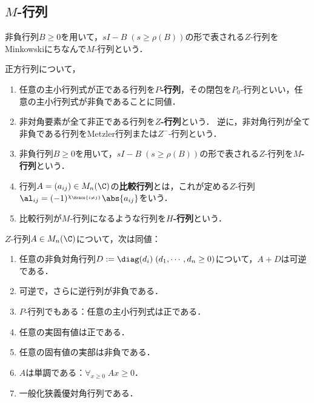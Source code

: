 \documentclass[uplatex, dvipdfmx]{jsreport}
\begin{document}
\subsection{$M$-行列}

\begin{tcolorbox}[colframe=ForestGreen, colback=ForestGreen!10!white,breakable,colbacktitle=ForestGreen!40!white,coltitle=black,fonttitle=\bfseries\sffamily,
title=]
    非負行列$B\ge0$を用いて，$sI-B\;(s\ge\rho(B))$の形で表される$Z$-行列をMinkowskiにちなんで$M$-行列という． 
\end{tcolorbox}

\begin{definition}
    正方行列について，
    \begin{enumerate}
        \item 任意の主小行列式が正である行列を\textbf{$P$-行列}，その閉包を$P_0$-行列といい，任意の主小行列式が非負であることに同値．
        \item 非対角要素が全て非正である行列を\textbf{$Z$-行列}という．
        逆に，非対角行列が全て非負である行列をMetzler行列または$Z^-$-行列という．
        \item 非負行列$B\ge0$を用いて，$sI-B\;(s\ge\rho(B))$の形で表される$Z$-行列を\textbf{$M$-行列}という．
        \item 行列$A=(a_{ij})\in M_n(\C)$の\textbf{比較行列}とは，これが定める$Z$-行列$\al_{ij}=(-1)^{\chi_{\Brace{i\ne j}}}\abs{a_{ij}}$をいう．
        \item 比較行列が$M$-行列になるような行列を\textbf{$H$-行列}という．
    \end{enumerate}
\end{definition}

\begin{theorem}
    $Z$-行列$A\in M_n(\C)$について，次は同値：
    \begin{enumerate}
        \item 任意の非負対角行列$D:=\diag(d_i)\;(d_1,\cdots,d_n\ge0)$について，$A+D$は可逆である．
        \item 可逆で，さらに逆行列が非負である．
        \item $P$-行列でもある：任意の主小行列式は正である．
        \item 任意の実固有値は正である．
        \item 任意の固有値の実部は非負である．
        \item $A$は単調である：$\forall_{x\ge0}\;Ax\ge0$．
        \item 一般化狭義優対角行列である．
    \end{enumerate}
\end{theorem}
\end{document}
